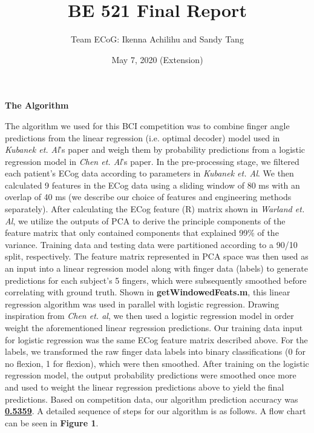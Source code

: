 \documentclass{article}
\date{May 7, 2020 (Extension)}
\begin{document}
	\title{BE 521 Final Report}
	\author{Team ECoG: Ikenna Achilihu and Sandy Tang}
	\maketitle
	\hrulefill

	\textbf{The Algorithm}

The algorithm we used for this BCI competition was to combine finger angle predictions from the linear regression (i.e. optimal decoder) model used in \textit{Kubanek et. Al}’s paper and weigh them by probability predictions from a logistic regression model in \textit{Chen et. Al}’s paper. In the pre-processing stage, we filtered each patient’s ECog data according to parameters in \textit{Kubanek et. Al}. We then calculated 9 features in the ECog data using a sliding window of 80 ms with an overlap of 40 ms (we describe our choice of features and engineering methods separately). After calculating the ECog feature (R) matrix shown in \textit{Warland et. Al}, we utilize the outputs of PCA to derive the principle components of the feature matrix that only contained components that explained 99\% of the variance. Training data and testing data were partitioned according to a 90/10 split, respectively. The feature matrix represented in PCA space was then used as an input into a linear regression model along with finger data (labels) to generate predictions for each subject’s 5 fingers, which were subsequently smoothed before correlating with ground truth. Shown in \textbf{getWindowedFeats.m}, this linear regression algorithm was used in parallel with logistic regression. Drawing inspiration from \textit{Chen et. al}, we then used a logistic regression model in order weight the aforementioned  linear regression predictions. Our training data input for logistic regression was the same ECog feature matrix described above. For the labels, we transformed the raw finger data labels into binary classifications (0 for no flexion, 1 for flexion), which were then smoothed. After training on the logistic regression model, the output probability predictions were smoothed once more and used to weight the linear regression predictions above to yield the final predictions. Based on competition data, our algorithm prediction accuracy was \underline{\textbf{0.5359}}. A detailed sequence of steps for our algorithm is as follows. A flow chart can be seen in \textbf{Figure 1}. \\
\end{document}
